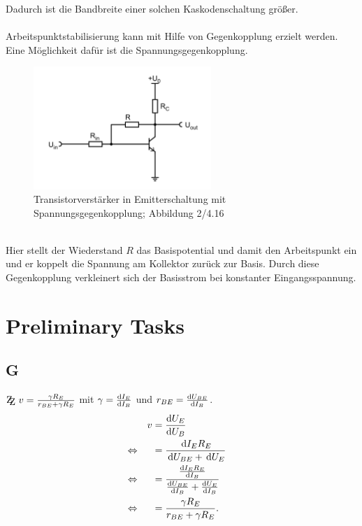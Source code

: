 \documentclass[a4paper,10pt]{article}
\newcommand{\td}{\,\text{d}}
\newcommand{\zz}{\mathrm{Z\kern-.3em\raise-0.5ex\hbox{Z} }}
\numberwithin{equation}{section}
\begin{document}
\begin{multicols}{2}
        Dadurch ist die Bandbreite einer solchen Kaskodenschaltung größer.
        \\\\Arbeitspunktstabilisierung kann mit Hilfe von Gegenkopplung erzielt werden.
        Eine Möglichkeit dafür ist die Spannungsgegenkopplung.
        \begin{figure}[h]
                \centering
                \includegraphics[width=0.6\textwidth]{spannungsgegenkopplung.png}
                \caption{Transistorverstärker in Emitterschaltung mit Spannungsgegenkopplung; Abbildung 2/4.16 \cite{Praktikumsanleitung}}
                \vspace{100cm}
        \end{figure}\\
        Hier stellt der Wiederstand $R$ das Basispotential und damit den Arbeitspunkt ein und er koppelt die Spannung am Kollektor zurück zur Basis.
        Durch diese Gegenkopplung verkleinert sich der Basisstrom bei konstanter Eingangsspannung.

        \newpage
        \section{Preliminary Tasks}
        \subsection{G}
        $\zz\ v=\tfrac{\gamma R_E}{r_{BE}+\gamma R_E}$ mit $\gamma =\diff[]{I_E}{I_B}$ und $r_{BE}=\diff[]{U_{BE}}{I_B}$.
        \begin{align} 
                && v &= \diff[]{U_E}{U_B} &&\\
                \Leftrightarrow && &= \dfrac{\td I_ER_E}{\td U_{BE}+\td U_E} &&\nonumber \\
                \Leftrightarrow && &= \dfrac{\diff[]{I_ER_E}{I_B}}{\diff[]{U_{BE}}{I_B}+\diff[]{U_E}{I_B}} &&\nonumber \\
                \Leftrightarrow && &= \dfrac{\gamma R_E}{r_{BE}+\gamma R_E}. &&
        \end{align} 


\end{multicols}
\end{document}
